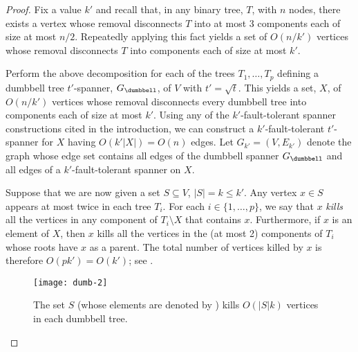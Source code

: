 \documentclass{cccg12}
\begin{document}
\begin{proof} 
  Fix a value $k'$ and recall that, in any binary tree, $T$, with $n$
  nodes, there exists a vertex whose removal disconnects $T$ into at
  most 3 components each of size at most $n/2$.  Repeatedly applying this
  fact yields a set of $O(n/k')$ vertices whose removal disconnects $T$
  into components each of size at most $k'$.%

  Perform the above decomposition for each of the trees $T_1,\ldots,T_p$
  defining a dumbbell tree $t'$-spanner, $G_\dumbbell$, of $V$ with
  $t'=\sqrt{t}$.  This yields a set, $X$, of $O(n/k')$ vertices
  whose removal disconnects every dumbbell tree into components
  each of size at most $k'$.  Using any of the $k'$-fault-tolerant
  spanner constructions cited in the introduction, we can construct a
  $k'$-fault-tolerant $t'$-spanner for $X$ having $O(k'|X|)=O(n)$ edges.
  Let $G_{k'}=(V,E_{k'})$ denote the graph whose edge set contains
  all edges of the dumbbell spanner $G_\dumbbell$ and all edges of a
  $k'$-fault-tolerant spanner on $X$.

  
  Suppose that we are now given a set $S\subseteq V$, $|S|=k\le k'$.
  Any vertex $x\in S$ appears at most twice in each tree $T_i$.  For each
  $i\in\{1,\ldots,p\}$, we say that $x$ \emph{kills} all the vertices
  in any component of $T_i\setminus X$ that contains $x$.  Furthermore,
  if $x$ is an element of $X$, then $x$ kills all the vertices in the
  (at most 2) components of $T_i$ whose roots have $x$ as a parent.
  The total number of vertices killed by $x$ is therefore $O(pk')=O(k')$;
  see .

  \begin{figure}
    \begin{center}
      \texttt{[image: dumb-2]}
    \end{center}
    \caption{The set $S$ (whose elements are denoted by \textbullet) kills
      $O(|S|k)$ vertices in each dumbbell tree.}
  \end{figure}
  

\end{proof}
\end{document}
